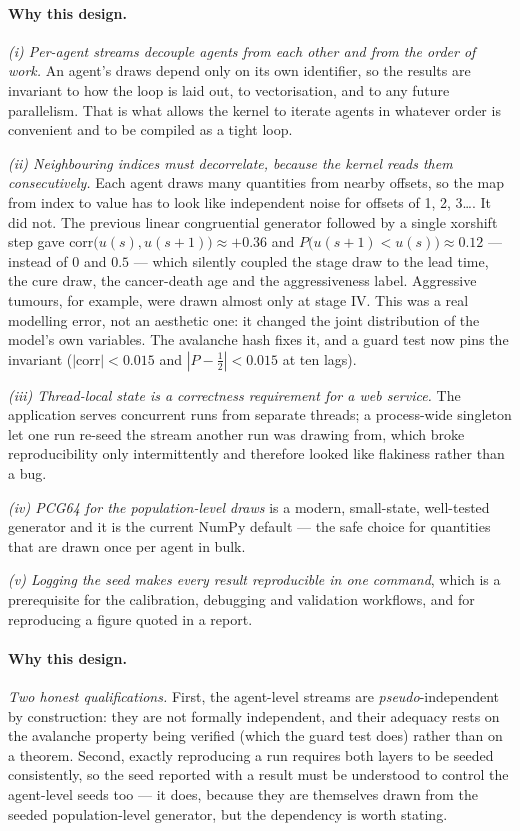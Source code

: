 \documentclass[12pt,a4paper]{article}
\newcommand{\why}[1]{\paragraph{Why this design.} #1}
\begin{document}
\why{\emph{(i) Per-agent streams decouple agents from each other and from the order of work.} An agent's
draws depend only on its own identifier, so the results are invariant to how the loop is laid out, to
vectorisation, and to any future parallelism. That is what allows the kernel to iterate agents in whatever
order is convenient and to be compiled as a tight loop.

\emph{(ii) Neighbouring indices must decorrelate, because the kernel reads them consecutively.} Each agent
draws many quantities from nearby offsets, so the map from index to value has to look like independent noise
for offsets of 1, 2, 3\ldots. It did not. The previous linear congruential generator followed by a single
xorshift step gave $\mathrm{corr}\bigl(u(s),u(s{+}1)\bigr)\approx+0.36$ and
$P\bigl(u(s{+}1)<u(s)\bigr)\approx0.12$ --- instead of $0$ and $0.5$ --- which silently coupled the stage
draw to the lead time, the cure draw, the cancer-death age and the aggressiveness label. Aggressive tumours,
for example, were drawn almost only at stage IV. This was a real modelling error, not an aesthetic one: it
changed the joint distribution of the model's own variables. The avalanche hash fixes it, and a guard test
now pins the invariant ($|\mathrm{corr}|<0.015$ and $|P-\tfrac12|<0.015$ at ten lags).

\emph{(iii) Thread-local state is a correctness requirement for a web service.} The application serves
concurrent runs from separate threads; a process-wide singleton let one run re-seed the stream another run
was drawing from, which broke reproducibility only intermittently and therefore looked like flakiness rather
than a bug.

\emph{(iv) PCG64 for the population-level draws} is a modern, small-state, well-tested generator and it is
the current NumPy default --- the safe choice for quantities that are drawn once per agent in bulk.

\emph{(v) Logging the seed makes every result reproducible in one command}, which is a prerequisite for the
calibration, debugging and validation workflows, and for reproducing a figure quoted in a report.}

\why{\emph{Two honest qualifications.} First, the agent-level streams are \emph{pseudo}-independent by
construction: they are not formally independent, and their adequacy rests on the avalanche property being
verified (which the guard test does) rather than on a theorem. Second, exactly reproducing a run requires
both layers to be seeded consistently, so the seed reported with a result must be understood to control the
agent-level seeds too --- it does, because they are themselves drawn from the seeded population-level
generator, but the dependency is worth stating.}
\end{document}
